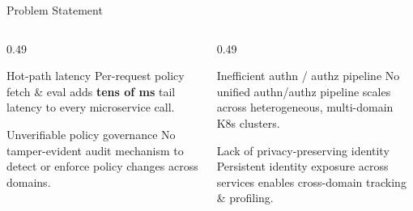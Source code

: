 \documentclass[aspectratio=169,11pt]{beamer}
\begin{document}
\begin{frame}{Problem Statement}
\vspace{2pt}
\begin{columns}[T,onlytextwidth]
\begin{column}{0.49\textwidth}
\begin{callout}{Hot-path latency}
Per-request policy fetch \& eval adds \textbf{tens of ms} tail latency to every microservice call.
\end{callout}\vspace{4pt}
\begin{callout}{Unverifiable policy governance}
No tamper-evident audit mechanism to detect or enforce policy changes across domains.
\end{callout}
\end{column}
\begin{column}{0.49\textwidth}
\begin{callout}{Inefficient authn / authz pipeline}
No unified authn/authz pipeline scales across heterogeneous, multi-domain K8s clusters.
\end{callout}\vspace{4pt}
\begin{callout}{Lack of privacy-preserving identity}
Persistent identity exposure across services enables cross-domain tracking \& profiling.
\end{callout}
\end{column}
\end{columns}
\end{frame}
\end{document}

